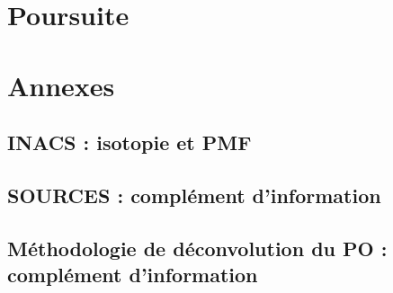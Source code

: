 \documentclass[a4paper,12pt]{book}
\begin{document}
\chapter{Poursuite}
\label{cha:travaux_futur}
\PartialToc
\clearpage

\clearpage
\printbibliography[segment=\therefsegment,heading=subbibliography]

\printbibliography


\chapter{Annexes}
\PartialToc
\appendix
\setcounter{table}{0}
\setcounter{figure}{0}
\setcounter{equation}{0}
\renewcommand{\thetable}{\thesection-\arabic{table}}
\renewcommand{\thefigure}{\thesection-\arabic{figure}}
\renewcommand{\theequation}{\thesection-\arabic{equation}}

\section{INACS : isotopie et PMF}%
\label{annexe:INACS}
% 

\section{SOURCES : complément d'information}
\label{annexe:SOURCES_SI}
% 

\section{Méthodologie de déconvolution du PO : complément d'information}
\label{annexe:deconvol_OP_SI}
%

\end{document}
